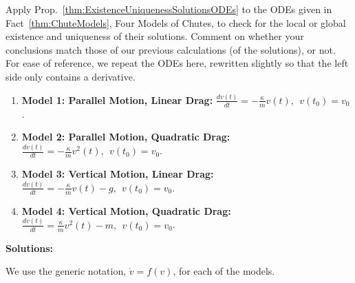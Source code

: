 \begin{exercise} 
Apply Prop.~\ref{thm:ExistenceUniquenessSolutionsODEs} to the ODEs given in Fact~\ref{thm:ChuteModels}, Four Models of Chutes, to check for the local or global existence and uniqueness of their solutions. Comment on whether your conclusions match those of our previous calculations (of the solutions), or not. \\

For ease of reference, we repeat the ODEs here, rewritten slightly so that the left side only contains a derivative.
 \begin{enumerate}
\renewcommand{\labelenumi}{(\alph{enumi})}
\setlength{\itemsep}{.2cm}
\item \textbf{Model 1: Parallel Motion, Linear Drag:} $\frac{dv(t)}{dt} =  - \frac{\kappa}{m} v(t), ~~v(t_0) = v_0$.

\item \textbf{Model 2: Parallel Motion, Quadratic Drag:} $\frac{dv(t)}{dt} =  - \frac{\kappa}{m} v^2(t), ~~v(t_0) = v_0$.

\item \textbf{Model 3: Vertical Motion, Linear Drag:} $\frac{dv(t)}{dt} = - \frac{\kappa}{m} v(t)- g, ~~v(t_0) = v_0$.

\item \textbf{Model 4: Vertical Motion, Quadratic Drag:} $\frac{dv(t)}{dt} = \frac{\kappa}{m} v^2(t)-m, ~~v(t_0) = v_0$.
\end{enumerate}    
\end{exercise}
\textbf{Solutions:}

We use the generic notation, $\dot{v}=f(v)$, for each of the models.

